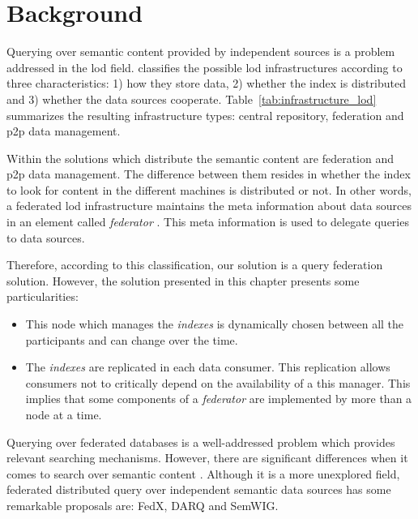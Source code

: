\section{Background}
\label{background}

Querying over semantic content provided by independent sources is a problem addressed in the \acl{lod} field.
\citet{gorlitz_federated_2011} classifies the possible \ac{lod} infrastructures according to three characteristics:
1) how they store data,
2) whether the index is distributed and
3) whether the data sources cooperate.
Table~\ref{tab:infrastructure_lod} summarizes the resulting infrastructure types: central repository, federation and \ac{p2p} data management.





Within the solutions which distribute the semantic content are federation and \ac{p2p} data management.
The difference between them resides in whether the index to look for content in the different machines is distributed or not.
In other words, a federated \ac{lod} infrastructure maintains the meta information about data sources in an element called \emph{federator} \citep{gorlitz_federated_2011}.
This meta information is used to delegate queries to data sources.

Therefore, according to this classification, our solution is a query federation solution.
However, the solution presented in this chapter presents some particularities:
\begin{itemize}
  \item This node which manages the \emph{indexes} is dynamically chosen between all the participants and can change over the time.
  \item The \emph{indexes} are replicated in each data consumer.
	This replication allows consumers not to critically depend on the availability of a this manager. %
	This implies that some components of a \emph{federator} are implemented by more than a node at a time.
\end{itemize}


\bigskip


Querying over federated databases is a well-addressed problem which provides relevant searching mechanisms.
However, there are significant differences when it comes to search over semantic content \citep{gorlitz_federated_2011}. %
Although it is a more unexplored field, federated distributed query over independent semantic data sources has some remarkable proposals are: FedX, DARQ and SemWIG.


